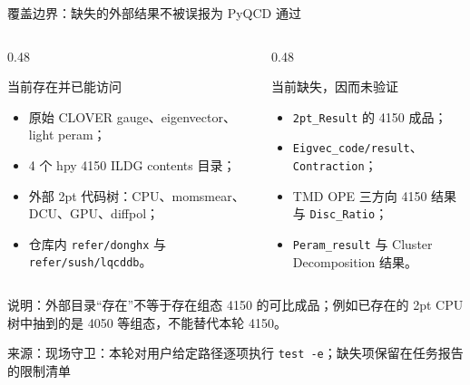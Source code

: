 \documentclass[UTF8,aspectratio=169,11pt]{ctexbeamer}
\newcommand{\source}[1]{\vspace{0.05em}\par{\raggedright\scriptsize\color{muted}来源：#1\par}}
\begin{document}
\begin{frame}[t]{覆盖边界：缺失的外部结果不被误报为 PyQCD 通过}
  \small
  \begin{columns}[T,totalwidth=\textwidth]
    \begin{column}{0.48\textwidth}
      \begin{block}{当前存在并已能访问}
        \begin{itemize}
          \item 原始 CLOVER gauge、eigenvector、light peram；
          \item 4 个 hpy 4150 ILDG contents 目录；
          \item 外部 2pt 代码树：CPU、momsmear、DCU、GPU、diffpol；
          \item 仓库内 \texttt{refer/donghx} 与 \texttt{refer/sush/lqcddb}。
        \end{itemize}
      \end{block}
    \end{column}
    \begin{column}{0.48\textwidth}
      \begin{block}{当前缺失，因而未验证}
        \begin{itemize}
          \item \texttt{2pt\_Result} 的 4150 成品；
          \item \texttt{Eigvec\_code/result}、\texttt{Contraction}；
          \item TMD OPE 三方向 4150 结果与 \texttt{Disc\_Ratio}；
          \item \texttt{Peram\_result} 与 Cluster Decomposition 结果。
        \end{itemize}
      \end{block}
    \end{column}
  \end{columns}
  \vfill
  \colorbox{warnbg}{\parbox{0.92\linewidth}{\small
    说明：外部目录“存在”不等于存在组态 4150 的可比成品；例如已存在的 2pt CPU 树中抽到的是 4050 等组态，不能替代本轮 4150。}}
  \source{现场守卫：本轮对用户给定路径逐项执行 \texttt{test -e}；缺失项保留在任务报告的限制清单}
\end{frame}
\end{document}
